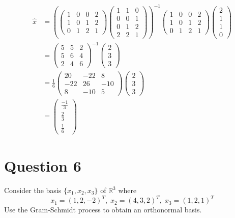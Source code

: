 \documentclass{article}
\begin{document}
\begin{align*}
    \hat{x} &= \left( \begin{pmatrix} 1 & 0 & 0 & 2 \\ 1 & 0 & 1 & 2 \\ 0 & 1 & 2 & 1 \end{pmatrix} \begin{pmatrix} 1 & 1 & 0 \\ 0 & 0 & 1 \\ 0 & 1 & 2 \\ 2 & 2 & 1 \end{pmatrix} \right)^{-1} \begin{pmatrix} 1 & 0 & 0 & 2 \\ 1 & 0 & 1 & 2 \\ 0 & 1 & 2 & 1 \end{pmatrix} \begin{pmatrix} 2 \\ 1 \\ 1 \\ 0 \end{pmatrix} \\
    &= \left( \begin{matrix} 5 & 5 & 2 \\ 5 & 6 & 4 \\ 2 & 4 & 6 \end{matrix} \right)^{-1} \begin{pmatrix} 2 \\ 3 \\ 3 \end{pmatrix} \\
    &= \frac{1}{6} \begin{pmatrix} 20 & -22 & 8 \\ -22 & 26 & -10 \\ 8 & -10 & 5 \end{pmatrix} \begin{pmatrix} 2 \\ 3 \\ 3 \end{pmatrix} \\
    &= \begin{pmatrix} \frac{-1}{3} \\ \frac{2}{3} \\ \frac{1}{6} \end{pmatrix}
\end{align*}

\newpage
\section*{Question 6}
Consider the basis $\{x_1, x_2, x_3\}$ of $\mathbb{R}^3$ where
$$ x_1 = (1, 2, -2)^T, \; x_2 = (4, 3, 2)^T, \; x_3 = (1, 2, 1)^T $$
Use the Gram-Schmidt process to obtain an orthonormal basis.
\end{document}

